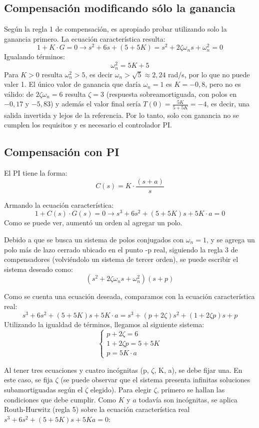 \documentclass[10pt]{article}
\begin{document}
\subsection*{Compensación modificando sólo la ganancia}

Según la regla 1 de compensación, es apropiado probar utilizando solo la ganancia primero.
La ecuación característica resulta:
\[
1+K\cdot G = 0 \rightarrow s^2 + 6s + (5+5K) = s^2 + 2\zeta \omega_n s + \omega_n^2 = 0
\]
Igualando términos:
\[
\omega_n^2 = 5K + 5
\]
Para $K > 0$ resulta $\omega_n^2 > 5$, es decir $\omega_n > \sqrt{5} \approx 2{,}24$ rad/s, por lo que no puede valer 1. 
El único valor de ganancia que daría $\omega_n = 1$ es $K = -0{,}8$, pero no es válido: de $2\zeta\omega_n = 6$ resulta $\zeta = 3$ (respuesta sobreamortiguada, con polos en $-0{,}17$ y $-5{,}83$) y además el valor final sería
$T(0) = \frac{5K}{5+5K} = -4$, es decir, una salida invertida y lejos de la referencia.
Por lo tanto, solo con ganancia no se cumplen los requisitos y es necesario el controlador PI.
\subsection*{Compensación con PI}

El PI tiene la forma:
\[
C(s) = K\cdot \frac{(s+a)}{s}
\]

Armando la ecuación característica:
\[
1+C(s)\cdot G(s) = 0 \rightarrow s^3+6s^2+(5+5K)s+5K\cdot a = 0
\]
Como se puede ver, aumentó un orden al agregar un polo.

Debido a que se busca un sistema de polos conjugados con $\omega_n=1$, y se agrega un polo más de lazo cerrado ubicado en el punto -p real, siguiendo la regla 3 de compensadores (volviéndolo un sistema de tercer orden), se puede escribir el sistema deseado como:
\[
(s^2+2\zeta \omega_n s + \omega_n^2)(s+p)
\]

Como se cuenta una ecuación deseada, comparamos con la ecuación característica real:
\[
s^3+6s^2+(5+5K)s+5K\cdot a = s^3+(p+2\zeta )s^2 + (1+2\zeta p)s + p
\]
Utilizando la igualdad de términos, llegamos al siguiente sistema:
\begin{equation}
    \begin{cases}
    p+2\zeta = 6 \\
    1+ 2\zeta p = 5 + 5K \\
    p = 5K\cdot a 
    \end{cases}
\end{equation}

Al tener tres ecuaciones y cuatro incógnitas (p, $\zeta$, K, a), se debe fijar una. En este caso, se fija $\zeta$ (se puede observar que el sistema presenta infinitas soluciones subamortiguadas según el $\zeta$ elegido).
Para elegir $\zeta$, primero se hallan las condiciones que debe cumplir.
Como $K$ y $a$ todavía son incógnitas, se aplica Routh-Hurwitz (regla 5) sobre la ecuación característica real $s^3 + 6s^2 + (5+5K)s + 5Ka = 0$:
\end{document}

